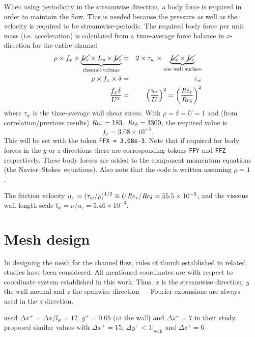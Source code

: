 \documentclass[11pt,a4paper]{report}
\def\Rey{\mbox{\it Re}}                             %
\newcommand\NavSto{Navier--Stokes}
\begin{document}
When using periodicity in the streamwise direction, a body force is
required in order to maintain the flow.  This is needed because the
pressure as well as the velocity is required to be
streamwise-periodic. The required body force per unit mass
(i.e. acceleration) is calculated from a time-average force balance in
$x$-direction for the entire channel
\begin{eqnarray*}
 \rho \times f_x \times
  \underbrace{\cancel{L_x} \times L_y \times \cancel{L_z}}_{\text{channel
    volume}}  &=& 2 \times \tau_w \times \underbrace{\cancel{L_x} \times
    \cancel{L_z}}_{\text{one wall surface}} \\ 
   \rho \times f_x \times \delta & = & \tau_w\\
    \frac{f_x\delta}{U^2} & = & \left(\frac{u_\tau}{U}\right)^2 = 
    \left(\frac{\Rey_\tau}{\Rey_\delta}\right)^2
  \label{eq:force_balance}
\end{eqnarray*}
where $\tau_w$ is the time-average wall shear stress.  With $\rho =
\delta = U= 1$ and (from correlation/previous results)
$\Rey_\tau=183$, $\Rey_\delta=3300$, the required value is
\[
  f_x = 3.08 \times 10^{-3} .
\]
This will be set with the token \texttt{FFX = 3.08e-3}.  Note that if
required for body forces in the $y$ or $z$ directions there are
corresponding tokens \texttt{FFY} and \texttt{FFZ} respectively.
These body forces are added to the component momentum equations (the
\NavSto\ equations).  Also note that the code is written assuming
$\rho=1$.

The friction velocity $u_\tau=(\tau_w/\rho)^{1/2}\equiv
U\Rey_\tau/\Rey_\delta=55.5\times10^{-3}$, and the viscous wall length
scale $l_w=\nu/u_\tau=5.46\times10^{-3}$.

\section{Mesh design}

In designing the mesh for the channel flow, rules of thumb established
in related studies \citep{pio97,kmm87,blsc03} have been
considered. All mentioned coordinates are with respect to coordinate
system established in this work. Thus, $x$ is the streamwise
direction, $y$ the wall-normal and $z$ the spanwise direction ---
Fourier expansions are always used in the $z$ direction.


\citet{kmm87} used $\Delta x^+ =\Delta x / l_w = 12$, $y^+ = 0.05$ (at
the wall) and $\Delta z^+ = 7$ in their study. \citep{pio97} proposed
similar values with $\Delta x^+ = 15$, $\Delta y^+ < 1|_\text{wall}$
and $\Delta z^+ = 6$.
\end{document}
